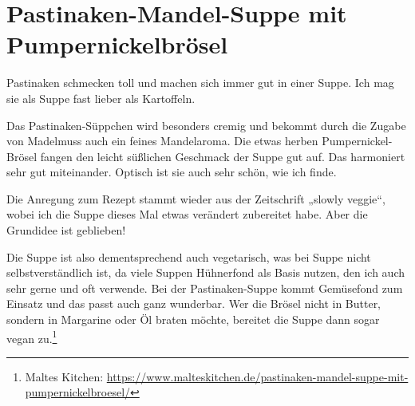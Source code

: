 \section{Pastinaken-Mandel-Suppe mit Pumpernickelbrösel}
Pastinaken schmecken toll und machen sich immer gut in einer Suppe. Ich mag sie als Suppe fast lieber als Kartoffeln.

Das Pastinaken-Süppchen wird besonders cremig und bekommt durch die Zugabe von Madelmuss auch ein feines Mandelaroma. Die etwas herben Pumpernickel-Brösel fangen den leicht süßlichen Geschmack der Suppe gut auf. Das harmoniert sehr gut miteinander. Optisch ist sie auch sehr schön, wie ich finde.

Die Anregung zum Rezept stammt wieder aus der Zeitschrift „slowly veggie“, wobei ich die Suppe dieses Mal etwas verändert zubereitet habe. Aber die Grundidee ist geblieben!

Die Suppe ist also dementsprechend auch vegetarisch, was bei Suppe nicht selbstverständlich ist, da viele Suppen Hühnerfond als Basis nutzen, den ich auch sehr gerne und oft verwende. Bei der Pastinaken-Suppe kommt Gemüsefond zum Einsatz und das passt auch ganz wunderbar. Wer die Brösel nicht in Butter, sondern in Margarine oder Öl braten möchte, bereitet die Suppe dann sogar vegan zu.\footnote{Maltes Kitchen: \url{https://www.malteskitchen.de/pastinaken-mandel-suppe-mit-pumpernickelbroesel/}}

